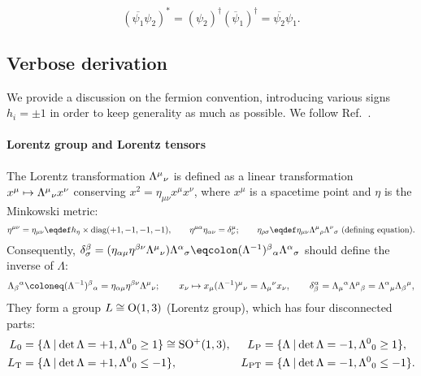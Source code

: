 \documentclass[CheatSheet]{subfiles}
\begin{document}
\begin{equation}
 (\overline{\psi_1}\psi_2)^* = (\psi_2)^\dagger(\overline\psi_1)^\dagger = \overline{\psi_2}\psi_1.
\end{equation}

\newpage
\detailstyle

\subsection{Verbose derivation}
We provide a discussion on the fermion convention, introducing various signs $h_i=\pm1$ in order to keep generality as much as possible. We follow Ref.~\cite{Kugo1}.

\paragraph{Lorentz group and Lorentz tensors}
The Lorentz transformation $\Lambda^{\mu}{}_{\nu}$ is defined as a linear transformation $x^\mu\mapsto\Lambda^{\mu}{}_{\nu} x^\nu$ conserving $x^2=\eta_{\mu\nu}x^\mu x^\nu$, where $x^\mu$ is a spacetime point and $\eta$ is the Minkowski metric:
\begin{equation}
 \eta^{\mu\nu}=\eta_{\mu\nu}\eqdef h_\eta\times\diag(+1,-1,-1,-1),\qquad
 \eta^{\mu\alpha}\eta_{\alpha\nu}=\delta^{\mu}_\nu;\qquad
 \eta_{\rho\sigma}\eqdef\eta_{\mu\nu}\LorTr\mu\rho\LorTr\nu\sigma ~\text{(defining equation)}.
\label{eq:LorTr}
\end{equation}
Consequently, $
  \delta^\beta_\sigma
  = (\eta_{\alpha\mu}\eta^{\beta\nu}\LorTr\mu\nu)\LorTr\alpha\sigma
  \eqcolon (\Lambda^{-1})^\beta{}_\alpha\LorTr\alpha\sigma$
should define the inverse of $\Lambda$:
\begin{equation}
  \Lambda_\beta{}^\alpha
  \deq (\Lambda^{-1})^\beta{}_\alpha
  = \eta_{\alpha\mu}\eta^{\beta\nu}\LorTr\mu\nu;
  \qquad
  x_\nu
  \mapsto x_\mu(\Lambda^{-1})^\mu{}_\nu
  =\Lambda_\mu{}^\nu x_\nu,\qquad
  \delta^\alpha_\beta
  =\Lambda_\mu{}^\alpha\LorTr\mu\beta
  =\LorTr\alpha\mu \Lambda_\beta{}^\mu,
\end{equation}
They form a group $L\cong\operatorname{\mathrm O}(1,3)$ (Lorentz group), which has four disconnected parts:
\begin{align}
 L\w 0  &=\{\Lambda\mathbin|\det\Lambda=+1, \LorTr00\ge1\}\cong \mathop{\mathrm{SO^+}}(1,3),&
 L\w P  &=\{\Lambda\mathbin|\det\Lambda=-1, \LorTr00\ge1\},\notag\\
 L\w T  &=\{\Lambda\mathbin|\det\Lambda=+1, \LorTr00\le-1\},&
 L\w{PT}&=\{\Lambda\mathbin|\det\Lambda=-1, \LorTr00\le-1\}.
\end{align}
\end{document}
